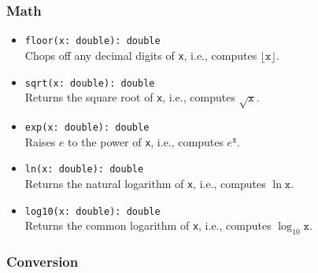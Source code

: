 \documentclass[10pt,landscape]{article}
\begin{document}
\begin{multicols*}{2}
\subsubsection*{Math}

\begin{itemize}
  \item \verb|floor(x: double): double|\\
    Chops off any decimal digits of \texttt{x},
    i.e., computes $\lfloor\mathtt{x}\rfloor$.
  \item \verb|sqrt(x: double): double|\\
    Returns the square root of \texttt{x}, i.e., computes $\sqrt{\mathtt{x}}$.
  \item \verb|exp(x: double): double|\\
    Raises $e$ to the power of \texttt{x}, i.e., computes $e^\mathtt{x}$.
  \item \verb|ln(x: double): double|\\
    Returns the natural logarithm of \texttt{x},
    i.e., computes $\ln \mathtt{x}$.
  \item \verb|log10(x: double): double|\\
    Returns the common logarithm of \texttt{x},
    i.e., computes $\log_{10} \mathtt{x}$.
\end{itemize}

\subsubsection*{Conversion}


\end{multicols*}
\end{document}
